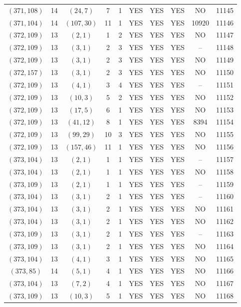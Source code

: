 \begin{longtable}{|c|c|c|c|c|c|c|c|c|c|}
$(371, 108)$ & 14 & $(24, 7)$ & 7 & 1 & YES & YES & YES & NO & 11145\\
$(371, 104)$ & 14 & $(107, 30)$ & 11 & 1 & YES & YES & YES & 10920 & 11146\\
$(372, 109)$ & 13 & $(2, 1)$ & 1 & 2 & YES & YES & YES & NO & 11147\\
$(372, 109)$ & 13 & $(3, 1)$ & 2 & 3 & YES & YES & YES & -- & 11148\\
$(372, 109)$ & 13 & $(3, 1)$ & 2 & 3 & YES & YES & YES & NO & 11149\\
$(372, 157)$ & 13 & $(3, 1)$ & 2 & 3 & YES & YES & YES & NO & 11150\\
$(372, 109)$ & 13 & $(4, 1)$ & 3 & 4 & YES & YES & YES & -- & 11151\\
$(372, 109)$ & 13 & $(10, 3)$ & 5 & 2 & YES & YES & YES & NO & 11152\\
$(372, 109)$ & 13 & $(17, 5)$ & 6 & 1 & YES & YES & YES & NO & 11153\\
$(372, 109)$ & 13 & $(41, 12)$ & 8 & 1 & YES & YES & YES & 8394 & 11154\\
$(372, 109)$ & 13 & $(99, 29)$ & 10 & 3 & YES & YES & YES & NO & 11155\\
$(372, 109)$ & 13 & $(157, 46)$ & 11 & 1 & YES & YES & YES & NO & 11156\\
$(373, 104)$ & 13 & $(2, 1)$ & 1 & 1 & YES & YES & YES & -- & 11157\\
$(373, 104)$ & 13 & $(2, 1)$ & 1 & 1 & YES & YES & YES & NO & 11158\\
$(373, 109)$ & 13 & $(2, 1)$ & 1 & 1 & YES & YES & YES & -- & 11159\\
$(373, 104)$ & 13 & $(3, 1)$ & 2 & 1 & YES & YES & YES & -- & 11160\\
$(373, 104)$ & 13 & $(3, 1)$ & 2 & 1 & YES & YES & YES & NO & 11161\\
$(373, 104)$ & 13 & $(3, 1)$ & 2 & 1 & YES & YES & YES & NO & 11162\\
$(373, 109)$ & 13 & $(3, 1)$ & 2 & 1 & YES & YES & YES & -- & 11163\\
$(373, 109)$ & 13 & $(3, 1)$ & 2 & 1 & YES & YES & YES & NO & 11164\\
$(373, 104)$ & 13 & $(4, 1)$ & 3 & 1 & YES & YES & YES & NO & 11165\\
$(373, 85)$ & 14 & $(5, 1)$ & 4 & 1 & YES & YES & YES & NO & 11166\\
$(373, 104)$ & 13 & $(7, 2)$ & 4 & 1 & YES & YES & YES & NO & 11167\\
$(373, 109)$ & 13 & $(10, 3)$ & 5 & 1 & YES & YES & YES & NO & 11168\\

\end{longtable}
